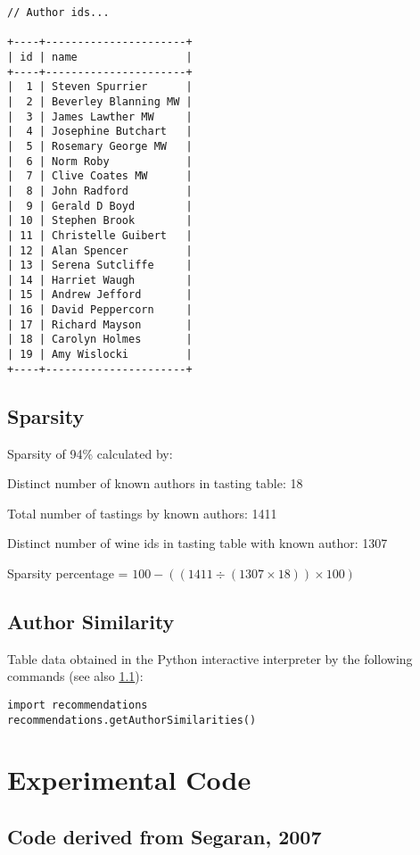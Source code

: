 \begin{verbatim}
// Author ids...

+----+----------------------+
| id | name                 |
+----+----------------------+
|  1 | Steven Spurrier      |
|  2 | Beverley Blanning MW |
|  3 | James Lawther MW     |
|  4 | Josephine Butchart   |
|  5 | Rosemary George MW   |
|  6 | Norm Roby            |
|  7 | Clive Coates MW      |
|  8 | John Radford         |
|  9 | Gerald D Boyd        |
| 10 | Stephen Brook        |
| 11 | Christelle Guibert   |
| 12 | Alan Spencer         |
| 13 | Serena Sutcliffe     |
| 14 | Harriet Waugh        |
| 15 | Andrew Jefford       |
| 16 | David Peppercorn     |
| 17 | Richard Mayson       |
| 18 | Carolyn Holmes       |
| 19 | Amy Wislocki         |
+----+----------------------+

\end{verbatim}

\subsection{Sparsity} \label{app:datasparsity}

Sparsity of 94\% calculated by:

Distinct number of known authors in tasting table: 18

Total number of tastings by known authors: 1411

Distinct number of wine ids in tasting table with known author: 1307

Sparsity percentage = $100 - (( 1411 \div ( 1307 \times 18 )) \times 100) $

\subsection{Author Similarity} \label{app:authorsim}

Table data obtained in the Python interactive interpreter by the following commands (see also \ref{app:recommendations}):

\begin{verbatim}
import recommendations
recommendations.getAuthorSimilarities()
\end{verbatim}

\section{Experimental Code}

\subsection{Code derived from Segaran, 2007} \label{app:recommendations}

